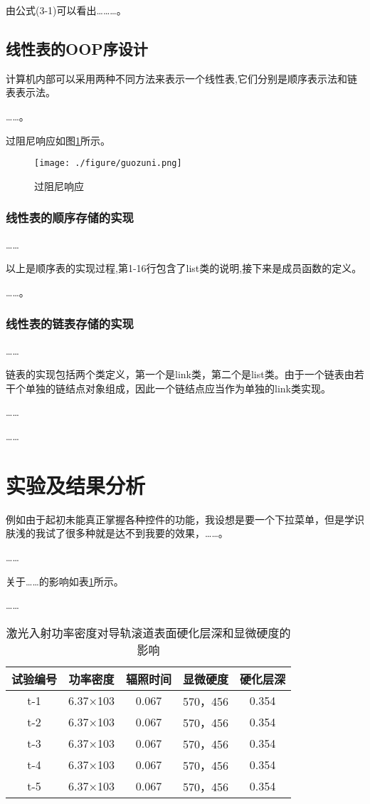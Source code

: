 \documentclass[supercite]{qustthesis}
\begin{document}
由公式(3-1)可以看出………。
\subsection{线性表的OOP序设计}
计算机内部可以采用两种不同方法来表示一个线性表,它们分别是顺序表示法和链表表示法。

……。

过阻尼响应如图\ref{guozuni}所示。
\begin{figure}[htbp]
\centering
\texttt{[image: ./figure/guozuni.png]}
\caption{过阻尼响应}
\label{guozuni}
\end{figure}
\subsubsection{线性表的顺序存储的实现}
……

以上是顺序表的实现过程,第1-16行包含了list类的说明,接下来是成员函数的定义。

……。
\subsubsection{线性表的链表存储的实现}
……

链表的实现包括两个类定义，第一个是link类，第二个是list类。由于一个链表由若干个单独的链结点对象组成，因此一个链结点应当作为单独的link类实现。

……

……

\section{实验及结果分析}
例如由于起初未能真正掌握各种控件的功能，我设想是要一个下拉菜单，但是学识肤浅的我试了很多种就是达不到我要的效果，……。

……

关于……的影响如表\ref{data_table}所示。

……

\begin{table}[htbp]
	\small
	\newcommand{\tabincell}[2]{\begin{tabular}{@{}#1@{}}#2\end{tabular}} 
	\centering
	\caption{激光入射功率密度对导轨滚道表面硬化层深和显微硬度的影响}
	\begin{tabular}{ccccc}
		\toprule
		试验编号 & 功率密度 & 辐照时间 & 显微硬度 	& 硬化层深\\ \midrule
		t-1	&6.37×103	&0.067	&570，456	&0.354\\
		t-2	&6.37×103	&0.067	&570，456	&0.354\\
		t-3	&6.37×103	&0.067	&570，456	&0.354\\
		t-4	&6.37×103	&0.067	&570，456	&0.354\\
		t-5	&6.37×103	&0.067	&570，456	&0.354\\ \bottomrule
	\end{tabular}
	\label{data_table}
\end{table}
\end{document}
